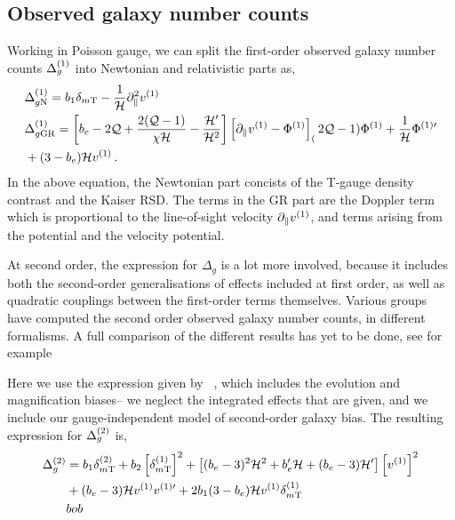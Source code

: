 \subsection{Observed galaxy number counts}
Working in Poisson gauge, we can split the first-order observed galaxy number counts $\Delta_g^{(1)}$ into Newtonian and relativistic parts as, 
\begin{align}
	&\Delta_{g\mathrm{N}}^{(1)} = b_1 \delta_{m\mathrm{T}} - \frac{1}{\mathcal{H}} \partial_\parallel^2 v^{(1)}\,\\
	&\Delta_{g\mathrm{GR}}^{(1)} = \left[ b_e - 2 \mathcal{Q} + \frac{2 (\mathcal{Q} - 1)}{\chi \mathcal{H}} - \frac{\mathcal{H}'}{\mathcal{H}^2} \right] \left[ \partial_\parallel v^{(1)} - \Phi^{(1)} \right] _ (2 \mathcal{Q} - 1) \Phi^{(1)} + \frac{1}{\mathcal{H}} \Phi^{{(1)} \prime} \nonumber \\
	& + (3 - b_e) \mathcal{H} v^{(1)}\,.
\end{align}
In the above equation, the Newtonian part concists of the T-gauge density contrast and the Kaiser RSD. The terms in the GR part are the Doppler term which is proportional to the line-of-sight velocity $\partial_\parallel v^{(1)}$, and terms arising from the potential and the velocity potential. 

At second order, the expression for $\Delta_g$ is a lot more involved, because it includes both the second-order generalisations of effects included at first order, as well as quadratic couplings between the first-order terms themselves. Various groups have computed the second order observed galaxy number counts, in different formalisms. A full comparison of the different results has yet to be done, see for example

Here we use the expression given by~\cite{Bertacca:2014hwa} , which includes the evolution and magnification biases-- we neglect the integrated effects that are given, and we include our gauge-independent model of second-order galaxy bias. The resulting expression for $\Delta_g^{(2)}$ is, 
\begin{align} 
\Delta_{g}^{(2)} &= b_1 \delta_{m{\mathrm{T}}}^{(2)} + b_2 \left[\delta_{m{\mathrm{T}}}^{(1)} \right]^2 + \left[(b_e-3)^2 \mathcal{H}^2 + b_e' \mathcal{H} +(b_e-3) \mathcal{H}' \right] \left[v^{(1)} \right]^2 \nonumber \\
& + (b_e - 3)\mathcal{H} v^{(1)} v^{{(1)} \prime} + 2b_1 (3 - b_e) \mathcal{H} v^{(1)} \delta_{m\mathrm{T}}^{(1)} \nonumber \\
& bob
\end{align}

